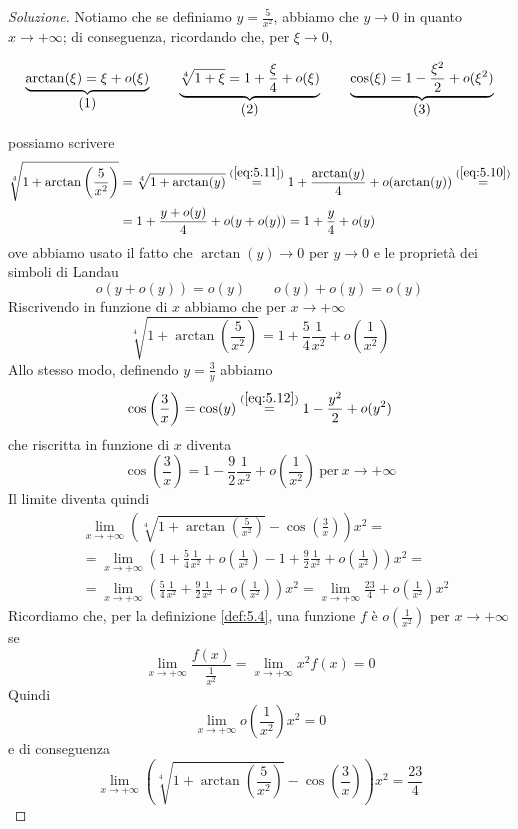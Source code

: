 \begin{proof}[Soluzione]
    Notiamo che se definiamo $y = \frac{5}{x^2}$, abbiamo che $y\to 0$ in quanto $x\to +\infty$; di conseguenza, ricordando che, per $\xi\to 0$,
    \begin{tcolorbox}
    \[
    \underbrace{\arctan(\xi) = \xi+o(\xi)}_{\stepcounter{equation}\mbox{(\theequation)}} \qquad \underbrace{\sqrt[4]{1+\xi} = 1+\frac{\xi}{4}+o(\xi)}_{\stepcounter{equation}\mbox{(\theequation)}} \qquad \underbrace{\cos(\xi) = 1-\frac{\xi^2}{2}+o(\xi^2)}_{\stepcounter{equation}\mbox{(\theequation)}}
    \]
    \addtocounter{equation}{-3}\label{eq:5.10}
    \addtocounter{equation}{0}\label{eq:5.11}
    \addtocounter{equation}{0}\label{eq:5.12}
    \end{tcolorbox}
    possiamo scrivere
    \[
    \begin{split}
        \sqrt[4]{1+\arctan\left(\frac{5}{x^2}\right)} & = \sqrt[4]{1+\arctan(y)} \overset{(\ref{eq:5.11})}{=} 1+\frac{\arctan(y)}{4}+o(\arctan(y)) \overset{(\ref{eq:5.10})}{=} \\
        & = 1 + \frac{y+o(y)}{4} + o(y+o(y)) = 1 + \frac{y}{4}+o(y)
    \end{split} 
    \]
    ove abbiamo usato il fatto che $\arctan(y)\to 0$ per $y\to 0$ e le proprietà dei simboli di Landau
    \[
    o(y+o(y)) = o(y) \qquad o(y)+o(y) = o(y)
    \]
    Riscrivendo in funzione di $x$ abbiamo che per $x\to +\infty$
    \[
    \sqrt[4]{1+\arctan\left(\frac{5}{x^2}\right)} = 1 + \frac{5}{4}\frac{1}{x^2} + o\left(\frac{1}{x^2}\right)
    \]
    Allo stesso modo, definendo $y=\frac{3}{y}$ abbiamo
    \[
    \cos\left(\frac{3}{x}\right) = \cos(y) \overset{(\ref{eq:5.12})}{=} 1-\frac{y^2}{2} + o(y^2)
    \]
    che riscritta in funzione di $x$ diventa
    \[
    \cos\left(\frac{3}{x}\right) = 1-\frac{9}{2}\frac{1}{x^2} + o\left(\frac{1}{x^2}\right) \ \text{per} \ x\to+\infty 
    \]
    Il limite diventa quindi
    \[
    \begin{split}
        & \lim_{x\to+\infty} \left(\sqrt[4]{1+   \arctan\left(\frac{5}{x^2}\right)}-\cos\left(\frac{3}{x}\right)\right)x^2 = \\
        & =  \lim_{x\to+\infty}\left(1+\frac{5}{4}\frac{1}{x^2} + o\left(\frac{1}{x^2}\right)-1+\frac{9}{2}\frac{1}{x^2}+o\left(\frac{1}{x^2}\right)\right)x^2 = \\
        & = \lim_{x\to+\infty}\left(\frac{5}{4}\frac{1}{x^2}+\frac{9}{2}\frac{1}{x^2} + o\left(\frac{1}{x^2}\right)\right)x^2 = \lim_{x\to+\infty} \frac{23}{4}+o\left(\frac{1}{x^2}\right)x^2
    \end{split}
    \]
    Ricordiamo che, per la definizione \ref{def:5.4}, una funzione $f$ è $o\left(\frac{1}{x^2}\right)$ per $x\to+\infty$ se
    \[
    \lim_{x\to+\infty}\frac{f(x)}{\frac{1}{x^2}} = \lim_{x\to+\infty}x^2 f(x) = 0
    \]
    Quindi 
    \[
    \lim_{x\to+\infty} o\left(\frac{1}{x^2}\right)x^2 = 0
    \]
    e di conseguenza
    \[
    \lim_{x\to +\infty} \left(\sqrt[4]{1+   \arctan\left(\frac{5}{x^2}\right)}-\cos\left(\frac{3}{x}\right)\right)x^2 = \frac{23}{4}
    \]
\end{proof}
